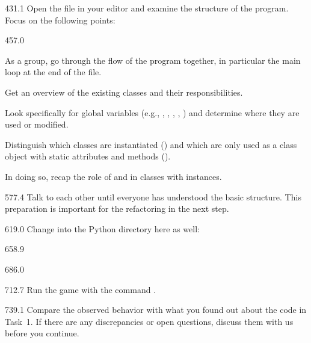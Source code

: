 \documentclass{aslab}
\begin{document}
\begin{region}[pitch=13.3]{431.1}
Open the file  in your editor and examine the structure of
the program.\\
Focus on the following points:
\end{region}

\begin{region}[pitch=13.35]{457.0}
\begin{dashlist}
\item As a group, go through the flow of the program together, in particular
  the main loop at the end of the file.
\item Get an overview of the existing classes and their responsibilities.
\item Look specifically for global variables (e.g., ,
  , , , ) and determine
  where they are used or modified.
\item Distinguish which classes are instantiated () and which are
  only used as a class object with static attributes and methods
  ().
\item In doing so, recap the role of  and  in
  classes with instances.
\end{dashlist}
\end{region}

\begin{region}[pitch=13.2]{577.4}
Talk to each other until everyone has understood the basic structure. This
preparation is important for the refactoring in the next step.
\end{region}

\begin{region}[pitch=13.3]{619.0}
Change into the Python directory here as well:
\end{region}

\begin{region}{658.9}
\end{region}

\begin{region}{686.0}
\end{region}

\begin{region}{712.7}
Run the game with the command .
\end{region}

\begin{region}[pitch=13.65]{739.1}
Compare the observed behavior with what you found out about the code in
Task~1. If there are any discrepancies or open questions, discuss them with us
before you continue.
\end{region}
\end{document}
